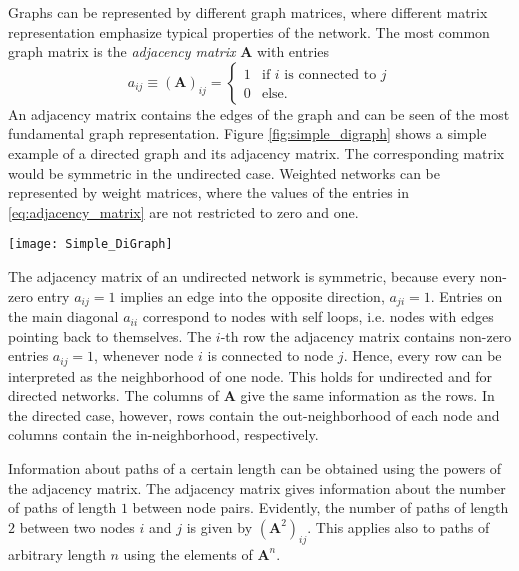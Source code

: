 Graphs can be represented by different graph matrices, where different matrix representation emphasize typical properties of the network.
The most common graph matrix is the \emph{adjacency matrix} $\mathbf{A}$ with entries
\begin{equation}\label{eq:adjacency_matrix}
a_{ij}\equiv (\mathbf{A})_{ij}= 
\begin{cases}
1 & \text{if $i$ is connected to $j$} \\
0 & \text{else.}
\end{cases} 
\end{equation}
An adjacency matrix contains the edges of the graph and can be seen of the most fundamental graph representation.
Figure \ref{fig:simple_digraph} shows a simple example of a directed graph and its adjacency matrix.
The corresponding matrix would be symmetric in the undirected case.
Weighted networks can be represented by weight matrices, where the values of the entries in \eqref{eq:adjacency_matrix} are not restricted to zero and one.
%
\begin{SCfigure}%
\texttt{[image: Simple\_DiGraph]}
\caption[Adjacency matrix.]{A simple directed network. The corresponding adjacency matrix is
\[
\mathbf{A}=\left(\begin{array}{cccc}0 & 1 & 1 & 0 \\0 & 0 & 0 & 1 \\0 & 1 & 0 & 0 \\0 & 1 & 1 & 0\end{array}\right).
\]
}
\label{fig:simple_digraph}
\end{SCfigure}

The adjacency matrix of an undirected network is symmetric, because every non-zero entry $a_{ij}=1$ implies an edge into the opposite direction, $a_{ji}=1$.
Entries on the main diagonal $a_{ii}$ correspond to nodes with self loops, i.e. nodes with edges pointing back to themselves.
The $i$-th row the adjacency matrix contains non-zero entries $a_{ij}=1$, whenever node $i$ is connected to node $j$.
Hence, every row can be interpreted as the neighborhood of one node.
This holds for undirected and for directed networks.
The columns of $\mathbf{A}$ give the same information as the rows.
In the directed case, however, rows contain the out-neighborhood of each node and columns contain the in-neighborhood, respectively.

Information about paths of a certain length can be obtained using the powers of the adjacency matrix.
The adjacency matrix gives information about the number of paths of length $1$ between node pairs.
Evidently, the number of paths of length $2$ between two nodes $i$ and $j$ is given by $(\mathbf{A}^2)_{ij}$.
This applies also to paths of arbitrary length $n$ using the elements of $\mathbf{A}^n$.

